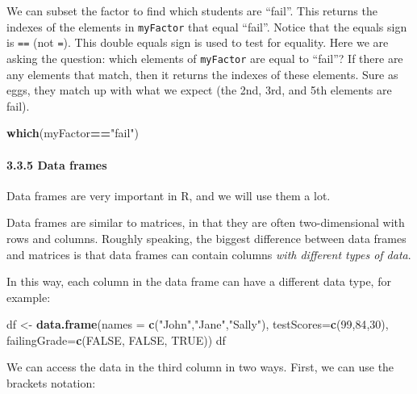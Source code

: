 \documentclass[]{article}
\newenvironment{Shaded}{\begin{snugshade}}{\end{snugshade}}
\newcommand{\DataTypeTok}[1]{\textcolor[rgb]{0.13,0.29,0.53}{#1}}
\newcommand{\DecValTok}[1]{\textcolor[rgb]{0.00,0.00,0.81}{#1}}
\newcommand{\KeywordTok}[1]{\textcolor[rgb]{0.13,0.29,0.53}{\textbf{#1}}}
\newcommand{\NormalTok}[1]{#1}
\newcommand{\OperatorTok}[1]{\textcolor[rgb]{0.81,0.36,0.00}{\textbf{#1}}}
\newcommand{\OtherTok}[1]{\textcolor[rgb]{0.56,0.35,0.01}{#1}}
\newcommand{\StringTok}[1]{\textcolor[rgb]{0.31,0.60,0.02}{#1}}
\let\oldparagraph\paragraph
\renewcommand{\paragraph}[1]{\oldparagraph{#1}\mbox{}}
\begin{document}
We can subset the factor to find which students are ``fail''. This
returns the indexes of the elements in \texttt{myFactor} that equal
``fail''. Notice that the equals sign is \texttt{==} (not \texttt{=}).
This double equals sign is used to test for equality. Here we are asking
the question: which elements of \texttt{myFactor} are equal to ``fail''?
If there are any elements that match, then it returns the indexes of
these elements. Sure as eggs, they match up with what we expect (the
2nd, 3rd, and 5th elements are fail).

\begin{Shaded}
\begin{Highlighting}[]
\KeywordTok{which}\NormalTok{(myFactor}\OperatorTok{==}\StringTok{"fail"}\NormalTok{)}
\end{Highlighting}
\end{Shaded}

\hypertarget{data-frames}{%
\paragraph{3.3.5 Data frames}\label{data-frames}}

Data frames are very important in R, and we will use them a lot.

Data frames are similar to matrices, in that they are often
two-dimensional with rows and columns. Roughly speaking, the biggest
difference between data frames and matrices is that data frames can
contain columns \emph{with different types of data}.

In this way, each column in the data frame can have a different data
type, for example:

\begin{Shaded}
\begin{Highlighting}[]
\NormalTok{df <-}\StringTok{ }\KeywordTok{data.frame}\NormalTok{(}\DataTypeTok{names =} \KeywordTok{c}\NormalTok{(}\StringTok{"John"}\NormalTok{,}\StringTok{"Jane"}\NormalTok{,}\StringTok{"Sally"}\NormalTok{), }
  \DataTypeTok{testScores=}\KeywordTok{c}\NormalTok{(}\DecValTok{99}\NormalTok{,}\DecValTok{84}\NormalTok{,}\DecValTok{30}\NormalTok{), }\DataTypeTok{failingGrade=}\KeywordTok{c}\NormalTok{(}\OtherTok{FALSE}\NormalTok{, }\OtherTok{FALSE}\NormalTok{, }\OtherTok{TRUE}\NormalTok{))}
\NormalTok{df}
\end{Highlighting}
\end{Shaded}

We can access the data in the third column in two ways. First, we can
use the brackets notation:
\end{document}
